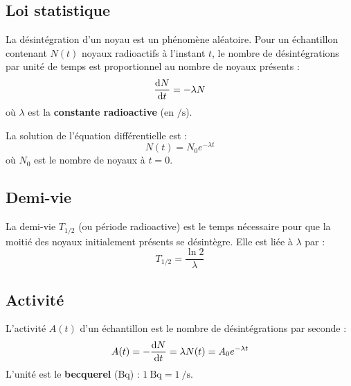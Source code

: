 \subsection{Loi statistique}
La désintégration d'un noyau est un phénomène aléatoire. Pour un échantillon contenant $N(t)$ noyaux radioactifs à l'instant $t$, le nombre de désintégrations par unité de temps est proportionnel au nombre de noyaux présents :
\[\dfrac{\mathrm{d}N}{\mathrm{d}t} = -\lambda N\]
où $\lambda$ est la \textbf{constante radioactive} (en $\si{\per\second}$).

\begin{loi}
La solution de l'équation différentielle est :
\[N(t) = N_0 e^{-\lambda t}\]
où $N_0$ est le nombre de noyaux à $t=0$.
\end{loi}

\begin{illus}
\end{illus}

\subsection{Demi-vie}
\begin{definition}
La demi-vie $T_{1/2}$ (ou période radioactive) est le temps nécessaire pour que la moitié des noyaux initialement présents se désintègre. Elle est liée à $\lambda$ par :
\[T_{1/2} = \frac{\ln 2}{\lambda}\]
\end{definition}

\subsection{Activité}
\begin{definition}[Activité]
L'activité $A(t)$ d'un échantillon est le nombre de désintégrations par seconde :
\[A(t) = -\dfrac{\mathrm{d}N}{\mathrm{d}t} = \lambda N(t) = A_0 e^{-\lambda t}\]
L'unité est le \textbf{becquerel} (Bq) : $\SI{1}{\becquerel} = \SI{1}{\per\second}$.
\end{definition}

